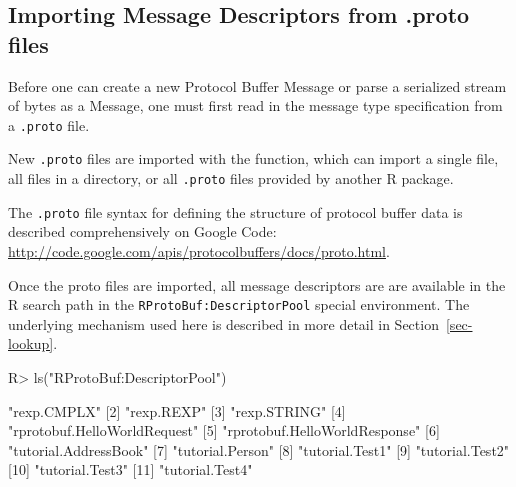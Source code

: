 \documentclass[article]{jss}
\newcommand{\CRANpkg}[1]{\pkg{#1}}
\begin{document}
%

\subsection{Importing Message Descriptors from .proto files}


Before one can create a new Protocol Buffer Message or parse a
serialized stream of bytes as a Message, one must first read in the message
type specification from a \texttt{.proto} file.

New \texttt{.proto} files are imported with the 
function, which can import a single file, all files in a directory, or
all \texttt{.proto} files provided by another R package.

The \texttt{.proto} file syntax for defining the structure of protocol
buffer data is described comprehensively on Google Code:
\url{http://code.google.com/apis/protocolbuffers/docs/proto.html}.

Once the proto files are imported, all message descriptors are
are available in the R search path in the \texttt{RProtoBuf:DescriptorPool}
special environment. The underlying mechanism used here is
described in more detail in Section~\ref{sec-lookup}.

\begin{Schunk}
\begin{Sinput}
R> ls("RProtoBuf:DescriptorPool")
\end{Sinput}
\begin{Soutput}
 [1] "rexp.CMPLX"                  
 [2] "rexp.REXP"                   
 [3] "rexp.STRING"                 
 [4] "rprotobuf.HelloWorldRequest" 
 [5] "rprotobuf.HelloWorldResponse"
 [6] "tutorial.AddressBook"        
 [7] "tutorial.Person"             
 [8] "tutorial.Test1"              
 [9] "tutorial.Test2"              
[10] "tutorial.Test3"              
[11] "tutorial.Test4"              
\end{Soutput}
\end{Schunk}
\end{document}
